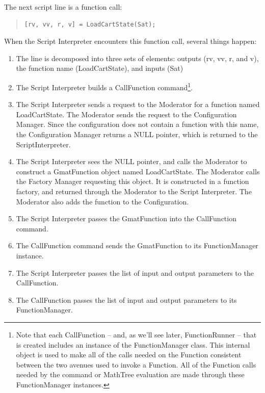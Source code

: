 \noindent The next script line is a function call:

\begin{quote}
\begin{verbatim}
[rv, vv, r, v] = LoadCartState(Sat);
\end{verbatim}
\end{quote}

\noindent When the Script Interpreter encounters this function call, several things happen:

\begin{enumerate}
\item The line is decomposed into three sets of elements: outputs (rv, vv, r, and v), the function
name (LoadCartState), and inputs (Sat)
\item The Script Interpreter builds a CallFunction command\footnote{Note that each CallFunction --
and, as we'll see later, FunctionRunner -- that is created includes an instance of the
FunctionManager class. This internal object is used to make all of the calls needed on the Function
consistent between the two avenues used to invoke a Function.  All of the Function calls needed by
the command or MathTree evaluation are made through these FunctionManager instances.}.
\item The Script Interpreter sends a request to the Moderator for a function named LoadCartState. 
The Moderator sends the request to the Configuration Manager. Since the configuration does not
contain a function with this name, the Configuration Manager returns a NULL pointer, which is
returned to the ScriptInterpreter.
\item The Script Interpreter sees the NULL pointer, and calls the Moderator to construct a
GmatFunction object named LoadCartState.  The Moderator calls the Factory Manager requesting this
object.  It is constructed in a function factory, and returned through the Moderator to the Script
Interpreter.  The Moderator also adds the function to the Configuration.
\item The Script Interpreter passes the GmatFunction into the CallFunction command.
\item The CallFunction command sends the GmatFunction to its FunctionManager instance.
\item The Script Interpreter passes the list of input and output parameters to the CallFunction.
\item The CallFunction passes the list of input and output parameters to its FunctionManager.
\end{enumerate}

